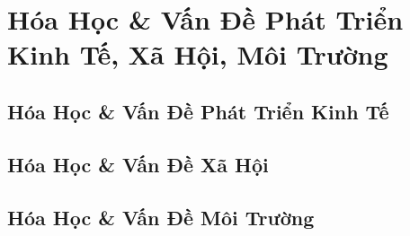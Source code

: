 \documentclass{article}
\numberwithin{equation}{section}
\begin{document}

\section{Hóa Học \& Vấn Đề Phát Triển Kinh Tế, Xã Hội, Môi Trường}

\subsection{Hóa Học \& Vấn Đề Phát Triển Kinh Tế}


\subsection{Hóa Học \& Vấn Đề Xã Hội}


\subsection{Hóa Học \& Vấn Đề Môi Trường}


\printbibliography[heading=bibintoc]
	
\end{document}
